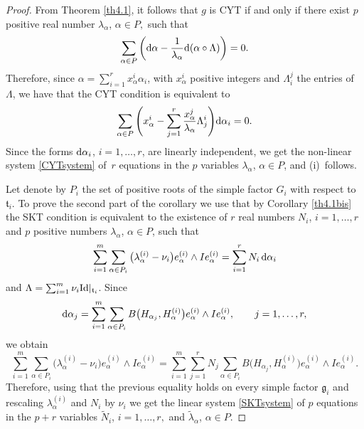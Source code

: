 \documentclass[pdftex]{sigma}
\numberwithin{equation}{section}
\begin{document}
\begin{proof}
From Theorem \ref{th4.1}, it follows that $g$ is CYT if and only if there exist $p$ positive real number $\lambda_{\alpha}$, $\alpha \in P,$ such that
\[
\sum_{\alpha \in P}  \bigg ({\rm d}\alpha - \frac{1}{\lambda_{\alpha} } {\rm d}( \alpha \circ \Lambda ) \bigg) =0.
\]
Therefore, since $\alpha =\sum_{i = 1}^r x_\alpha^i \alpha_i$, with $x_\alpha^i$ positive integers and $\Lambda_i^j$ the entries of $\Lambda$,
 we have that the CYT condition is equivalent to
\[
\sum_{\alpha \in P} \Bigg( x_\alpha^i - \sum_{j=1}^r \frac{x_\alpha^j}{\lambda_{\alpha}} \Lambda^i_j \Bigg) {\rm d}\alpha_i = 0.
\]
Since the forms ${\rm d} \alpha_i$, $i= 1, \dots, r$, are linearly independent, we get the non-linear system \eqref{CYTsystem} of~$r$ equations in the $p$ variables $\lambda_{\alpha}$, $\alpha \in P$, and (i)~follows.

Let denote by $P_i$ the set of positive roots of the simple factor $G_i$ with respect to $\mathfrak t_i$.
To prove the second part of the corollary we use that by Corollary \ref{th4.1bis} the SKT condition is equivalent to the existence of $r$ real numbers $N_i$, $i = 1, \dots, r$ and $p$ positive numbers $\lambda_{\alpha}$, $\alpha \in P$, such that
\[
\sum_{i = 1}^m \sum_{\alpha \in P_i} \big(\lambda_{\alpha}^{(i)} - \nu_i\big) e_{\alpha}^{(i)} \wedge I e_{\alpha}^{(i)} = \sum_{i = 1}^r N_i \, {\rm d}\alpha_i
\]
and $\Lambda = \sum_{i =1}^m \nu_i {\rm Id} |_{\mathfrak t_i}$.
Since
\[
{\rm d}\alpha_j= \sum_{i = 1}^m \sum_{\alpha \in P_i} B\big(H_{\alpha_j}, H_{\alpha}^{(i)}\big) e_{\alpha} ^{(i)} \wedge I e_{\alpha}^{(i)}, \qquad j =1, \dots, r,
\]
we obtain
\[
\sum_{i =1}^m \sum_{\alpha \in P_i} \big(\lambda_{\alpha}^{(i)} - \nu_i\big) e_{\alpha}^{(i)} \wedge I e_{\alpha} ^{(i)}= \sum_{i =1}^m \sum_{j = 1}^r N_j \sum_{\alpha \in P_i} B\big(H_{\alpha_j}, H_{\alpha}^{(i)}\big) e_{\alpha}^{(i)} \wedge I e_{\alpha}^{(i)}.
\]
Therefore, using that the previous equality holds on every simple factor $\mathfrak g_i$ and rescaling $\lambda_{\alpha}^{(i)}$ and $N_i$ by $\nu_i$ we get the linear system \eqref{SKTsystem} of $p$ equations in the $p + r$ variables $\tilde N_i$, $i = 1, \dots, r,$ and $ \tilde \lambda_{\alpha}$, $\alpha \in P.$


\end{proof}
\end{document}
